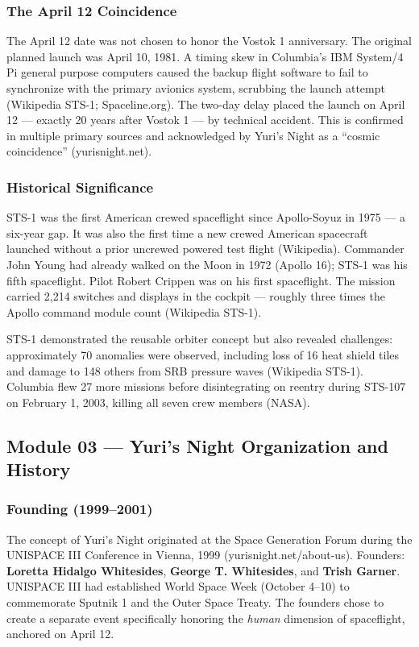 \documentclass[11pt,letterpaper]{article}
\begin{document}
\subsubsection{The April 12 Coincidence}

The April 12 date was not chosen to honor the Vostok 1 anniversary. The original planned launch was April 10, 1981. A timing skew in Columbia's IBM System/4 Pi general purpose computers caused the backup flight software to fail to synchronize with the primary avionics system, scrubbing the launch attempt (Wikipedia STS-1; Spaceline.org). The two-day delay placed the launch on April 12 — exactly 20 years after Vostok 1 — by technical accident. This is confirmed in multiple primary sources and acknowledged by Yuri's Night as a ``cosmic coincidence'' (yurisnight.net).

\subsubsection{Historical Significance}

STS-1 was the first American crewed spaceflight since Apollo-Soyuz in 1975 — a six-year gap. It was also the first time a new crewed American spacecraft launched without a prior uncrewed powered test flight (Wikipedia). Commander John Young had already walked on the Moon in 1972 (Apollo 16); STS-1 was his fifth spaceflight. Pilot Robert Crippen was on his first spaceflight. The mission carried 2,214 switches and displays in the cockpit — roughly three times the Apollo command module count (Wikipedia STS-1).

STS-1 demonstrated the reusable orbiter concept but also revealed challenges: approximately 70 anomalies were observed, including loss of 16 heat shield tiles and damage to 148 others from SRB pressure waves (Wikipedia STS-1). Columbia flew 27 more missions before disintegrating on reentry during STS-107 on February 1, 2003, killing all seven crew members (NASA).

\subsection{Module 03 — Yuri's Night Organization and History}

\subsubsection{Founding (1999--2001)}

The concept of Yuri's Night originated at the Space Generation Forum during the UNISPACE III Conference in Vienna, 1999 (yurisnight.net/about-us). Founders: \textbf{Loretta Hidalgo Whitesides}, \textbf{George T. Whitesides}, and \textbf{Trish Garner}. UNISPACE III had established World Space Week (October 4--10) to commemorate Sputnik 1 and the Outer Space Treaty. The founders chose to create a separate event specifically honoring the \emph{human} dimension of spaceflight, anchored on April 12.
\end{document}
